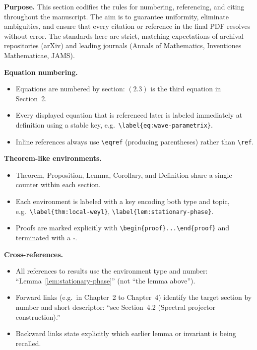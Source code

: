 \noindent \textbf{Purpose.}
This section codifies the rules for numbering, referencing, and citing throughout the manuscript. The aim is to guarantee uniformity, eliminate ambiguities, and ensure that every citation or reference in the final PDF resolves without error. The standards here are strict, matching expectations of archival repositories (arXiv) and leading journals (Annals of Mathematics, Inventiones Mathematicae, JAMS).

\medskip
\noindent \textbf{Equation numbering.}
\begin{itemize}
  \item Equations are numbered by section: \((2.3)\) is the third equation in Section~2.
  \item Every displayed equation that is referenced later is labeled immediately at definition using a stable key, e.g.\ \verb|\label{eq:wave-parametrix}|.
  \item Inline references always use \verb|\eqref| (producing parentheses) rather than \verb|\ref|.
\end{itemize}

\medskip
\noindent \textbf{Theorem-like environments.}
\begin{itemize}
  \item Theorem, Proposition, Lemma, Corollary, and Definition share a single counter within each section.
  \item Each environment is labeled with a key encoding both type and topic, e.g.\ \verb|\label{thm:local-weyl}|, \verb|\label{lem:stationary-phase}|.
  \item Proofs are marked explicitly with \verb|\begin{proof}...\end{proof}| and terminated with a \(\square\).
\end{itemize}

\medskip
\noindent \textbf{Cross-references.}
\begin{itemize}
  \item All references to results use the environment type and number: “Lemma~\ref{lem:stationary-phase}” (not “the lemma above”).
  \item Forward links (e.g.\ in Chapter~2 to Chapter~4) identify the target section by number and short descriptor: “see Section~4.2 (Spectral projector construction).”
  \item Backward links state explicitly which earlier lemma or invariant is being recalled.
\end{itemize}

